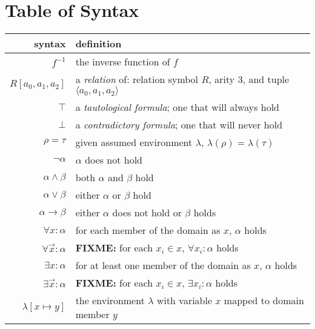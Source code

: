 \section{Table of Syntax}
	\begin{tabular}{|r|l|}
		\hline
		\textbf{syntax}                  &  \textbf{definition}                                                     \\
		\hline
		$f^{-1}$                         &  the inverse function of $f$                                             \\
		\hline
		$R[a_0,a_1,a_2]$                 &  a \emph{relation} of: relation symbol $R$, arity $3$, and tuple $\langle a_0,a_1,a_2 \rangle$  \\
		$\top$                           &  a \emph{tautological formula}; one that will always hold                \\
		$\bot$                           &  a \emph{contradictory formula}; one that will never hold                \\
		$\rho = \tau$                    &  given assumed environment $\lambda$, $\lambda(\rho) = \lambda(\tau)$    \\
		$\neg \alpha$                    &  $\alpha$ does not hold                                                  \\
		$\alpha \wedge \beta$            &  both $\alpha$ and $\beta$ hold                                          \\
		$\alpha \vee \beta$              &  either $\alpha$ or $\beta$ hold                                         \\
		$\alpha \to \beta$               &  either $\alpha$ does not hold or $\beta$ holds                          \\
		$\forall x : \alpha$             &  for each member of the domain as $x$, $\alpha$ holds                    \\
		$\forall \vec{x} : \alpha$       &  \textbf{FIXME:} for each $x_i \in x$, $\forall x_i : \alpha$ holds      \\
		$\exists x : \alpha$             &  for at least one member of the domain as $x$, $\alpha$ holds            \\
		$\exists \vec{x} : \alpha$       &  \textbf{FIXME:} for each $x_i \in x$, $\exists x_i : \alpha$ holds      \\
		\hline
		$\lambda[x \mapsto y]$           &  the environment $\lambda$ with variable $x$ mapped to domain member $y$ \\

\end{tabular}
